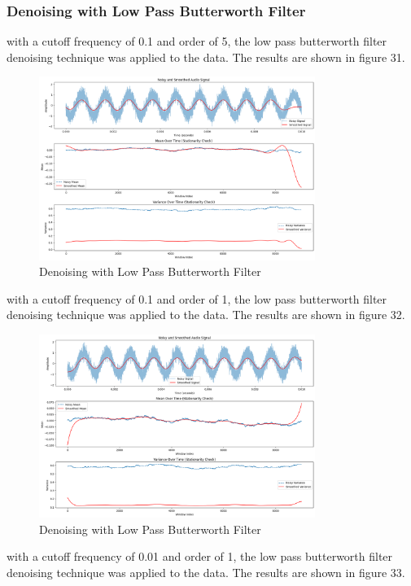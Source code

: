 \documentclass[a4paper,12pt]{article} %
\begin{document}
\clearpage
\subsubsection{ Denoising with Low Pass Butterworth Filter}
with a cutoff frequency of 0.1 and order of 5, the low pass butterworth filter denoising technique was applied to the data. The results are shown in figure 31.
\begin{figure}[h]
\centering
\includegraphics[width=0.8\textwidth]{Q3_LPB_0.1_1.png}
\caption{Denoising with Low Pass Butterworth Filter}
\end{figure}
\clearpage
with a cutoff frequency of 0.1 and order of 1, the low pass butterworth filter denoising technique was applied to the data. The results are shown in figure 32.
\begin{figure}[h]
\centering
\includegraphics[width=0.8\textwidth]{Q3_LPB_0.1_2.png}
\caption{Denoising with Low Pass Butterworth Filter}
\end{figure}
\clearpage
with a cutoff frequency of 0.01 and order of 1, the low pass butterworth filter denoising technique was applied to the data. The results are shown in figure 33.
\end{document}
